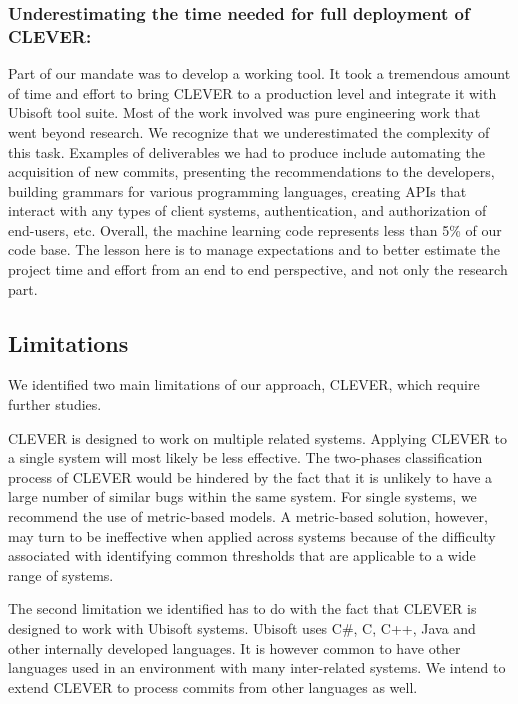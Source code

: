 \documentclass[sigconf]{acmart}
\begin{document}
\subsubsection{Underestimating the time needed for full deployment of
CLEVER:}\label{underestimating-the-time-needed-for-full-deployment-of-clever}

Part of our mandate was to develop a working tool. It took a tremendous
amount of time and effort to bring CLEVER to a production level and
integrate it with Ubisoft tool suite. Most of the work involved was pure
engineering work that went beyond research. We recognize that we
underestimated the complexity of this task. Examples of deliverables we
had to produce include automating the acquisition of new commits,
presenting the recommendations to the developers, building grammars for
various programming languages, creating APIs that interact with any
types of client systems, authentication, and authorization of end-users,
etc. Overall, the machine learning code represents less than 5\% of our
code base. The lesson here is to manage expectations and to better
estimate the project time and effort from an end to end perspective, and
not only the research part.

\subsection{Limitations}\label{limitations}

We identified two main limitations of our approach, CLEVER, which
require further studies.

CLEVER is designed to work on multiple related systems. Applying CLEVER
to a single system will most likely be less effective. The two-phases
classification process of CLEVER would be hindered by the fact that it
is unlikely to have a large number of similar bugs within the same
system. For single systems, we recommend the use of metric-based models.
A metric-based solution, however, may turn to be ineffective when
applied across systems because of the difficulty associated with
identifying common thresholds that are applicable to a wide range of
systems.

The second limitation we identified has to do with the fact that CLEVER
is designed to work with Ubisoft systems. Ubisoft uses C\#, C, C++, Java
and other internally developed languages. It is however common to have
other languages used in an environment with many inter-related systems.
We intend to extend CLEVER to process commits from other languages as
well.
\end{document}
